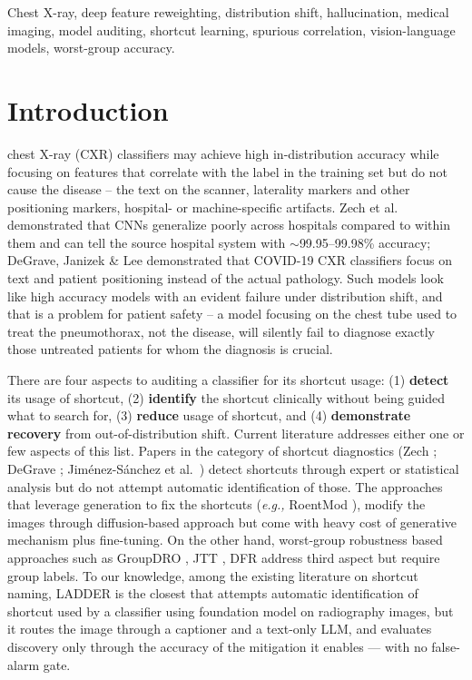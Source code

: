 \documentclass{ieeeaccess}
\begin{document}
\begin{IEEEkeywords}
Chest X-ray, deep feature reweighting, distribution shift, hallucination, medical imaging, model auditing, shortcut learning, spurious correlation, vision-language models, worst-group accuracy.
\end{IEEEkeywords}

\titlepgskip=-21pt
\maketitle

\section{Introduction}
 chest X-ray (CXR) classifiers may achieve high in-distribution accuracy while focusing on features that correlate with the label in the training set but do not cause the disease -- the text on the scanner, laterality markers and other positioning markers, hospital- or machine-specific artifacts. Zech et al.\ \cite{zech2018} demonstrated that CNNs generalize poorly across hospitals compared to within them and can tell the source hospital system with $\sim$99.95--99.98\% accuracy; DeGrave, Janizek \& Lee \cite{degrave2021} demonstrated that COVID-19 CXR classifiers focus on text and patient positioning instead of the actual pathology. Such models look like high accuracy models with an evident failure under distribution shift, and that is a problem for patient safety -- a model focusing on the chest tube used to treat the pneumothorax, not the disease, will silently fail to diagnose exactly those untreated patients for whom the diagnosis is crucial.

There are four aspects to auditing a classifier for its shortcut usage: (1) \textbf{detect} its usage of shortcut, (2) \textbf{identify} the shortcut clinically without being guided what to search for, (3) \textbf{reduce} usage of shortcut, and (4) \textbf{demonstrate recovery} from out-of-distribution shift. Current literature addresses either one or few aspects of this list. Papers in the category of shortcut diagnostics (Zech \cite{zech2018}; DeGrave \cite{degrave2021}; Jim\'enez-S\'anchez et al.\ \cite{jimenez2023}) detect shortcuts through expert or statistical analysis but do not attempt automatic identification of those. The approaches that leverage generation to fix the shortcuts (\textit{e.g., }RoentMod \cite{roentmod}), modify the images through diffusion-based approach but come with heavy cost of generative mechanism plus fine-tuning. On the other hand, worst-group robustness based approaches such as GroupDRO \cite{sagawa2020groupdro}, JTT \cite{liu2021jtt}, DFR \cite{kirichenko2022dfr} address third aspect but require group labels. To our knowledge, among the existing literature on shortcut naming, LADDER \cite{ladder} is the closest that attempts automatic identification of shortcut used by a classifier using foundation model on radiography images, but it routes the image through a captioner and a text-only LLM, and evaluates discovery only through the accuracy of the mitigation it enables --- with no false-alarm gate.
\end{document}

